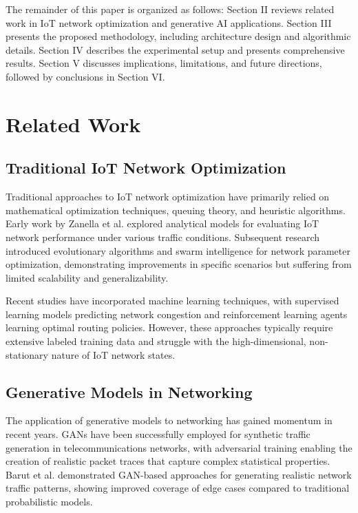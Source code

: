 \documentclass[conference]{IEEEtran}
\begin{document}
The remainder of this paper is organized as follows: Section II reviews related work in IoT network optimization and generative AI applications. Section III presents the proposed methodology, including architecture design and algorithmic details. Section IV describes the experimental setup and presents comprehensive results. Section V discusses implications, limitations, and future directions, followed by conclusions in Section VI.

\section{Related Work}

\subsection{Traditional IoT Network Optimization}

Traditional approaches to IoT network optimization have primarily relied on mathematical optimization techniques, queuing theory, and heuristic algorithms. Early work by Zanella et al. explored analytical models for evaluating IoT network performance under various traffic conditions. Subsequent research introduced evolutionary algorithms and swarm intelligence for network parameter optimization, demonstrating improvements in specific scenarios but suffering from limited scalability and generalizability.

Recent studies have incorporated machine learning techniques, with supervised learning models predicting network congestion and reinforcement learning agents learning optimal routing policies. However, these approaches typically require extensive labeled training data and struggle with the high-dimensional, non-stationary nature of IoT network states.

\subsection{Generative Models in Networking}

The application of generative models to networking has gained momentum in recent years. GANs have been successfully employed for synthetic traffic generation in telecommunications networks, with adversarial training enabling the creation of realistic packet traces that capture complex statistical properties. Barut et al. demonstrated GAN-based approaches for generating realistic network traffic patterns, showing improved coverage of edge cases compared to traditional probabilistic models.
\end{document}
